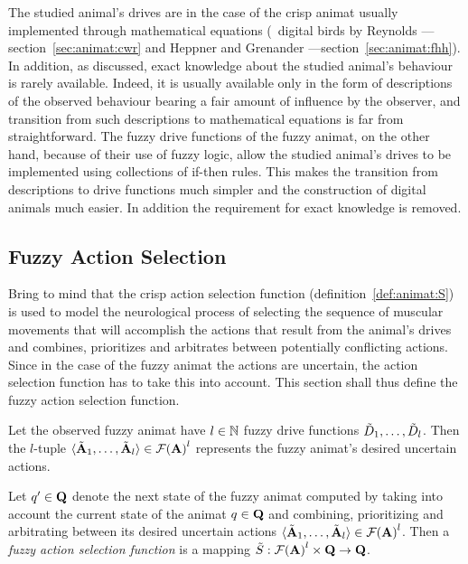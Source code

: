 The studied animal's drives are in the case of the crisp animat  usually implemented through mathematical equations (\eg\ digital birds by Reynolds \cite{reynolds:1987,reynolds:1999}---section~\ref{sec:animat:cwr} and Heppner and Grenander \cite{heppner:1990}---section~\ref{sec:animat:fhh}). In addition, as discussed, exact knowledge about the studied animal's behaviour is rarely available. Indeed, it is usually available only in the form of descriptions of the observed behaviour bearing a fair amount of influence by the observer, and transition from such descriptions to mathematical equations is far from straightforward. The fuzzy drive functions of the fuzzy animat, on the other hand, because of their use of fuzzy logic, allow the studied animal's drives to be implemented using collections of if-then rules. This makes the transition from descriptions to drive functions much simpler and the construction of digital animals much easier. In addition the requirement for exact knowledge is removed.
 
\subsection{Fuzzy Action Selection}
Bring to mind that the crisp action selection function (definition~\ref{def:animat:S}) is used to model the neurological process of selecting the sequence of muscular movements that will accomplish the actions that result from the animal's drives and combines, prioritizes and arbitrates between potentially conflicting actions. Since in the case of the fuzzy animat the actions are uncertain, the action selection function has to take this into account. This section shall thus define the fuzzy action selection function.

Let the observed fuzzy animat have $l \in \mathbb{N}$ fuzzy drive functions ${\tilde{D}}_1,\ldots,{\tilde{D}}_l$. Then the $l$-tuple $\langle {\ensuremath{\tilde{{\mathbf{A}}}}}_1,\ldots,{\tilde{{\mathbf{A}}}}_l \rangle \in {\ensuremath{\mathcal{F}({\mathbf{A}})}}^l$ represents the fuzzy animat's desired uncertain actions.

\begin{defn}
\label{def:fuzzyAnimat:S}
Let $q' \in {\ensuremath{\mathbf{Q}}}$ denote the next state of the fuzzy animat computed by taking into account the current state of the animat $q \in {\ensuremath{\mathbf{Q}}}$ and combining, prioritizing and arbitrating between its desired uncertain actions $\langle {\ensuremath{\tilde{{\mathbf{A}}}}}_1,\ldots,{\tilde{{\mathbf{A}}}}_l \rangle \in {\ensuremath{\mathcal{F}({\mathbf{A}})}}^l$. Then a \emph{fuzzy action selection function} is a mapping ${\tilde{S}}: {\mathcal{F}({\mathbf{A}})}^l \times {\ensuremath{\mathbf{Q}}} \rightarrow {\ensuremath{\mathbf{Q}}}$.
\end{defn}


